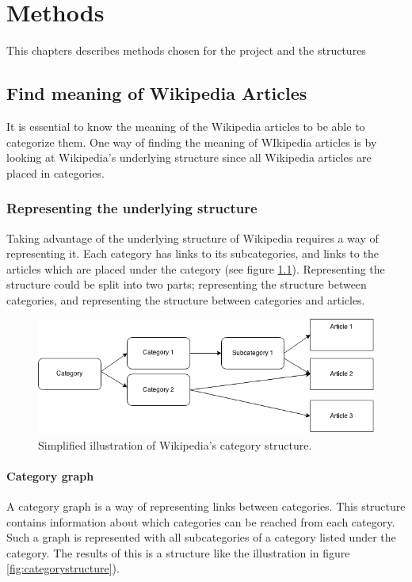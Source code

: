\chapter{Methods}
This chapters describes methods chosen for the project and the structures 


\section{Find meaning of Wikipedia Articles}
It is essential to know the meaning of the Wikipedia articles to be able to categorize them. 
One way of finding the meaning of WIkipedia articles is by looking at Wikipedia's underlying structure since all Wikipedia articles are placed in categories. 


\subsection{Representing the underlying structure}
Taking advantage of the underlying structure of Wikipedia requires a way of representing it. Each category has links to its subcategories, and links to the articles which are placed under the category (see figure \ref{fig:graphstructure}). Representing the structure could be split into two parts; representing the structure between categories, and representing the structure between categories and articles. 

\begin{figure}
\centering
\includegraphics[width=\textwidth]{Chapters/Methods/graphstructure}
\caption{Simplified illustration of Wikipedia's category structure.}
\label{fig:graphstructure}
\end{figure}

\subsubsection{Category graph}
A category graph is a way of representing links between categories. This structure contains information about which categories can be reached from each category. Such a graph is represented with all subcategories of a category listed under the category. The results of this is a structure like the illustration in figure \ref{fig:categorystructure}).

